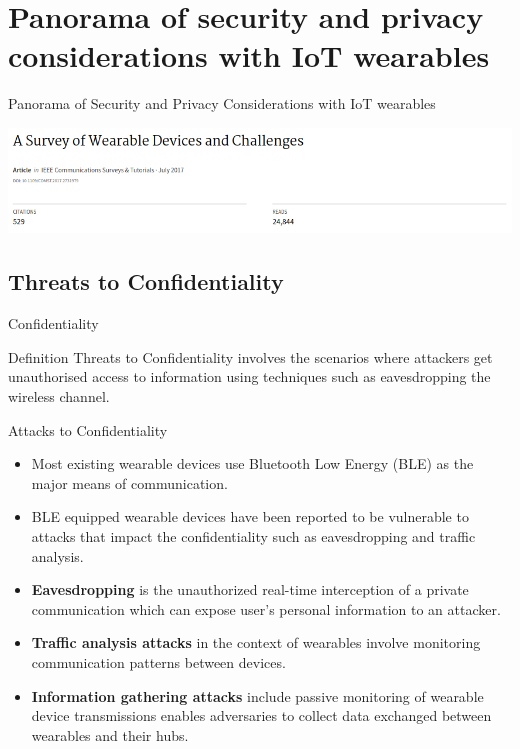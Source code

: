 \documentclass[ucs,9pt,usenames,dvipsnames]{beamer}
\begin{document}
\section{Panorama of security and privacy considerations with IoT wearables}

\begin{frame}[fragile]{Panorama of Security and Privacy Considerations with IoT wearables}

\includegraphics[width=1\linewidth]{imgs/ASurveyofWearableDevicesandChallenges}

\end{frame}


\subsection{Threats to Confidentiality}

\begin{frame}{Confidentiality}
	\begin{alertblock}{Definition}
	Threats to Confidentiality involves
	the scenarios where attackers get unauthorised access
	to information using techniques such as eavesdropping the
	wireless channel. 
	\end{alertblock}
	
	
	
\end{frame}

\begin{frame}{Attacks to Confidentiality}
	\begin{itemize}
		\item Most existing wearable devices use Bluetooth Low Energy (BLE) as the major means of communication.
		\item BLE equipped 	wearable devices have been reported to be vulnerable to attacks that impact the confidentiality such as eavesdropping and traffic analysis.
		
		\item \textbf{Eavesdropping} is the unauthorized real-time interception of a private communication which can expose user’s personal information to an attacker.
		
		\item \textbf{Traffic analysis attacks} in the context of wearables involve monitoring communication patterns between devices.
		
	\item \textbf{Information gathering attacks} include passive monitoring of wearable device transmissions enables adversaries to collect data exchanged between wearables and their hubs. 
	\end{itemize}
\end{frame}
\end{document}
